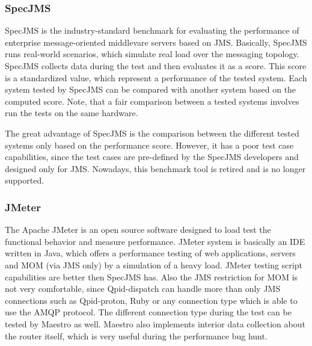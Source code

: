 \subsubsection*{SpecJMS}
SpecJMS is the industry-standard benchmark for evaluating the performance of enterprise message-oriented middlevare servers based on JMS. Basically, SpecJMS runs real-world scenarios, which simulate real load over the messaging topology. SpecJMS collects data during the test and then evaluates it as a score. This score is a standardized value, which represent a performance of the tested system. Each system tested by SpecJMS can be compared with another system based on the computed score. Note, that a fair comparison between a tested systems involves run the tests on the same hardware.

The great advantage of SpecJMS is the comparison between the different tested systems only based on the performance score. However, it has a poor test case capabilities, since the test cases are pre-defined by the SpecJMS developers and designed only for JMS. Nowadays, this benchmark tool is retired and is no longer supported.

\subsubsection*{JMeter}
The Apache JMeter is an open source software designed to load test the functional behavior and measure performance. JMeter system is basically an IDE written in Java, which offers a performance testing of web applications, servers and MOM (via JMS only) by a simulation of a heavy load. JMeter testing script capabilities are better then SpecJMS has. Also the JMS restriction for MOM is not very comfortable, since Qpid-dispatch can handle more than only JMS connections such as Qpid-proton, Ruby or any connection type which is able to use the AMQP protocol. The different connection type during the test can be tested by Maestro as well. Maestro also implements interior data collection about the router itself, which is very useful during the performance bug hunt.
